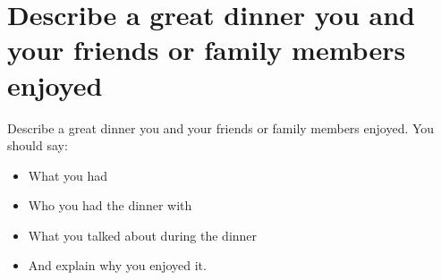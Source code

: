 \section{Describe a great dinner you and your friends or family members enjoyed}
\begin{ieltsprompt}
Describe a great dinner you and your friends or family members enjoyed.
You should say:
\begin{itemize}[leftmargin=2em, itemsep=2pt]
\item What you had
\item Who you had the dinner with
\item What you talked about during the dinner
\item And explain why you enjoyed it.
\end{itemize}
\end{ieltsprompt}
